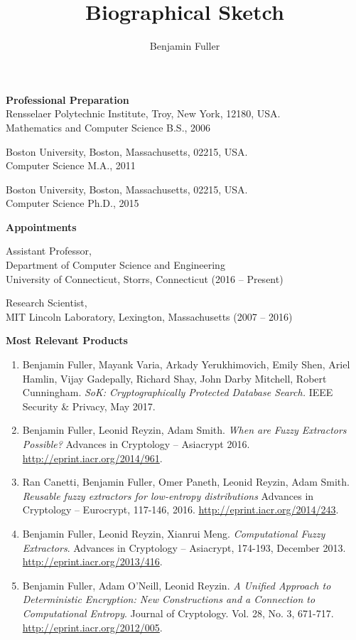 \documentclass{article}
\title{Biographical Sketch}
\author{Benjamin Fuller}
\date{}
\begin{document}
\maketitle


\noindent \textbf{Professional Preparation}\\
Rensselaer Polytechnic Institute, Troy, New York, 12180, USA. \\Mathematics and Computer Science B.S., 2006

\noindent
Boston University, Boston, Massachusetts, 02215, USA.\\Computer Science M.A., 2011

\noindent
Boston University, Boston, Massachusetts, 02215, USA.\\Computer Science Ph.D., 2015

\vspace{.1in}
\noindent \textbf{Appointments}


\noindent
Assistant Professor, \\
Department of Computer Science and Engineering\\
University of Connecticut, Storrs, Connecticut (2016 -- Present)

\vspace{.1in}\noindent
Research Scientist,\\
MIT Lincoln Laboratory, Lexington, Massachusetts (2007 -- 2016)

\vspace{.1in}
\noindent
\textbf{Most Relevant Products} 

\begin{enumerate}
\item Benjamin Fuller, Mayank Varia, Arkady Yerukhimovich, Emily Shen, Ariel Hamlin, Vijay Gadepally, Richard Shay, John Darby Mitchell, Robert Cunningham. \emph{SoK: Cryptographically Protected Database Search.}  IEEE Security \& Privacy, May 2017.
\item Benjamin Fuller, Leonid Reyzin, Adam Smith.  \emph{When are Fuzzy Extractors Possible?} Advances in Cryptology -- Asiacrypt 2016.  \href{http://eprint.iacr.org/2014/961}{http://eprint.iacr.org/2014/961}.
\item Ran Canetti, Benjamin Fuller, Omer Paneth, Leonid Reyzin, Adam Smith.  \emph{Reusable fuzzy extractors for low-entropy distributions}  Advances in Cryptology -- Eurocrypt, 117-146, 2016.  \href{http://eprint.iacr.org/2014/243}{http://eprint.iacr.org/2014/243}.
\item Benjamin Fuller, Leonid Reyzin, Xianrui Meng.  \emph{Computational Fuzzy Extractors}.  Advances in Cryptology -- Asiacrypt, 174-193, December 2013.  \href{http://eprint.iacr.org/2013/416}{http://eprint.iacr.org/2013/416}.

\item Benjamin Fuller, Adam O'Neill, Leonid Reyzin. \emph{A Unified Approach to Deterministic Encryption: New Constructions and a Connection to Computational Entropy}. Journal of Cryptology.  Vol. 28, No. 3, 671-717.  \href{http://eprint.iacr.org/2012/005}{http://eprint.iacr.org/2012/005}.
\end{enumerate}
\end{document}
